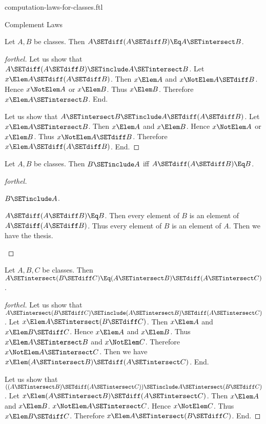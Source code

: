 \documentclass{stex}
\begin{document}
\begin{smodule}{computation-laws-for-classes.ftl}
\begin{sfragment}{Complement Laws}
  \begin{proposition}[forthel]
    Let $A, B$ be classes.
    Then $A \SETdiff (A \SETdiff B) \Eq A \SETintersect B$.
  \end{proposition}
  \begin{proof}[forthel]
    Let us show that $A \SETdiff (A \SETdiff B) \SETinclude A \SETintersect B$.
      Let $x \Elem A \SETdiff (A \SETdiff B)$.
      Then $x \Elem A$ and $x \NotElem A \SETdiff B$.
      Hence $x \NotElem A$ or $x \Elem B$.
      Thus $x \Elem B$.
      Therefore $x \Elem A \SETintersect B$.
    End.

    Let us show that $A \SETintersect B \SETinclude A \SETdiff (A \SETdiff B)$.
      Let $x \Elem A \SETintersect B$.
      Then $x \Elem A$ and $x \Elem B$.
      Hence $x \NotElem A$ or $x \Elem B$.
      Thus $x \NotElem A \SETdiff B$.
      Therefore $x \Elem A \SETdiff (A \SETdiff B)$.
    End.
  \end{proof}

  \begin{proposition}[forthel]
    Let $A, B$ be classes.
    Then $B \SETinclude A$ iff $A \SETdiff (A \SETdiff B) \Eq B$.
  \end{proposition}
  \begin{proof}[forthel]
    \begin{case}{$B \SETinclude A$.} \end{case}

    \begin{case}{$A \SETdiff (A \SETdiff B) \Eq B$.}
      Then every element of $B$ is an element of $A \SETdiff (A \SETdiff B)$.
      Thus every element of $B$ is an element of $A$.
      Then we have the thesis.
    \end{case}
  \end{proof}

  \begin{proposition}[forthel]
    Let $A, B, C$ be classes.
    Then $A \SETintersect (B \SETdiff C) \Eq (A \SETintersect B) \SETdiff (A \SETintersect C)$.
  \end{proposition}
  \begin{proof}[forthel]
    Let us show that $A \SETintersect (B \SETdiff C) \SETinclude (A \SETintersect B) \SETdiff (A \SETintersect C)$.
      Let $x \Elem A \SETintersect (B \SETdiff C)$.
      Then $x \Elem A$ and $x \Elem B \SETdiff C$.
      Hence $x \Elem A$ and $x \Elem B$.
      Thus $x \Elem A \SETintersect B$ and $x \NotElem C$.
      Therefore $x \NotElem A \SETintersect C$.
      Then we have $x \Elem (A \SETintersect B) \SETdiff (A \SETintersect C)$.
    End.

    Let us show that $((A \SETintersect B) \SETdiff (A \SETintersect C)) \SETinclude A \SETintersect (B \SETdiff C)$. %
      Let $x \Elem (A \SETintersect B) \SETdiff (A \SETintersect C)$.
      Then $x \Elem A$ and $x \Elem B$.
      $x \NotElem A \SETintersect C$.
      Hence $x \NotElem C$.
      Thus $x \Elem B \SETdiff C$.
      Therefore $x \Elem A \SETintersect (B \SETdiff C)$.
    End.
  \end{proof}
\end{sfragment}
\end{smodule}
\end{document}
